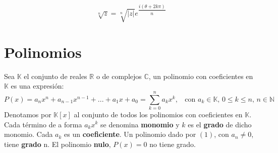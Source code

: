 \documentclass[11pt,a4paper]{article}
\begin{document}
$$\sqrt[n]{z} = \sqrt[n]{|z|} e^{\dfrac{i(\theta + 2k\pi)}{n}}$$

\section{Polinomios}
\noindent Sea $\mathbb{K}$ el conjunto de reales $\mathbb{R}$ o de complejos $\mathbb{C}$, un polinomio con coeficientes en $\mathbb{K}$ es una expresi\'on: 
\begin{equation}
P(x)=a_nx^n + a_{n-1}x^{n-1}+...+a_1x+a_0 = \sum_{k=0}^n a_kx^k,\ \ \ \ \text{con $a_k \in \mathbb{K}$, $0\leq k \leq n$, $n\in\mathbb{N}$}
\end{equation}
Denotamos por $\mathbb{K}[x]$ al conjunto de todos los polinomios con coeficientes en $\mathbb{K}$. Cada t\'ermino de a forma $a_kx^k$ se denomina \textbf{monomio} y $k$ es el \textbf{grado} de dicho monomio. Cada $a_k$ es un \textbf{coeficiente}. Un polinomio dado por $(1)$, con $a_n \not = 0$, tiene \textbf{grado} n. El polinomio \textbf{nulo}, $P(x)=0$ no tiene grado.\\
\end{document}
